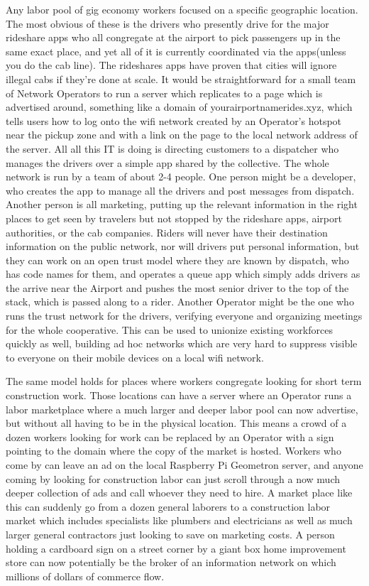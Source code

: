Any labor pool of gig economy workers focused on a specific geographic location.  The most obvious of these is the drivers who presently drive for the major rideshare apps who all congregate at the airport to pick passengers up in the same exact place, and yet all of it is currently coordinated via the apps(unless you do the cab line).  The rideshares apps have proven that cities will ignore illegal cabs if they're done at scale.  It would be straightforward for a small team of Network Operators to run a server which replicates to a page which is advertised around, something like a domain of yourairportnamerides.xyz, which tells users how to log onto the wifi network created by an Operator's hotspot near the pickup zone and with a link on the page to the local network address of the server.  All all this IT is doing is directing customers to a dispatcher who manages the drivers over a simple app shared by the collective.  The whole network is run by a team of about 2-4 people.  One person might be a developer, who creates the app to manage all the drivers and post messages from dispatch.  Another person is all marketing, putting up the relevant information in the right places to get seen by travelers but not stopped by the rideshare apps, airport authorities, or the cab companies.  Riders will never have their destination information on the public network, nor will drivers put personal information, but they can work on an open trust model where they are known by dispatch, who has code names for them, and operates a queue app which simply adds drivers as the arrive near the Airport and pushes the most senior driver to the top of the stack, which is passed along to a rider.  Another Operator might be the one who runs the trust network for the drivers, verifying everyone and organizing meetings for the whole cooperative.  This can be used to unionize existing workforces quickly as well, building ad hoc networks which are very hard to suppress visible to everyone on their mobile devices on a local wifi network.  

The same model holds for places where workers congregate looking for short term construction work.  Those locations can have a server where an Operator runs a labor marketplace where a much larger and deeper labor pool can now advertise, but without all having to be in the physical location.  This means a crowd of a dozen workers looking for work can be replaced by an Operator with a sign pointing to the domain where the copy of the market is hosted.  Workers who come by can leave an ad on the local Raspberry Pi Geometron server, and anyone coming by looking for construction labor can just scroll through a now much deeper collection of ads and call whoever they need to hire.  A market place like this can suddenly go from a dozen general laborers to a construction labor market which includes specialists like plumbers and electricians as well as much larger general contractors just looking to save on marketing costs.  A person holding a cardboard sign on a street corner by a giant box home improvement store can now potentially be the broker of an information network on which millions of dollars of commerce flow.  


